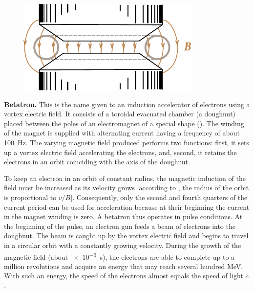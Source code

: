 \begin{figure}[t]
	\begin{center}
		\includegraphics[scale=1]{figures/ch_10/fig_10_15.pdf}
		\caption[]{}
		\label{fig:10_15}
	\end{center}
	\vspace{-0.8cm}
\end{figure}

\textbf{Betatron.} This is the name given to an induction accelerator of electrons using a vortex electric field.
It consists of a toroidal evacuated chamber (a doughnut) placed between the poles of an electromagnet of a special shape ().
The winding of the magnet is supplied with alternating current having a frequency of about \SI{100}{\hertz}.
The varying magnetic field produced performs two functions: first, it sets up a vortex electric field accelerating the electrons, and, second, it retains the electrons in an orbit coinciding with the axis of the doughnut.

To keep an electron in an orbit of constant radius, the magnetic induction of the field must be increased as its velocity grows [according to , the radius of the orbit is proportional to $v/B$].
Consequently, only the second and fourth quarters of the current period can be used for acceleration because at their beginning the current in the magnet winding is zero.
A betatron thus operates in pulse conditions.
At the beginning of the pulse, an electron gun feeds a beam of electrons into the doughnut.
The beam is caught up by the vortex electric field and begins to travel in a circular orbit with a constantly growing velocity.
During the growth of the magnetic field (about \SI{e-3}{\second}), the electrons are able to complete up to a million revolutions and acquire an energy that may reach several hundred \si{\mega\electronvolt}.
With such an energy, the speed of the electrons almost equals the speed of light $c$.

